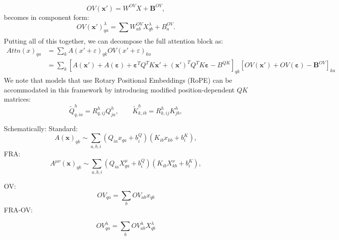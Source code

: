 \documentclass[11pt]{article}
\theoremstyle{definition}
\theoremstyle{plain}
\theoremstyle{remark}
\begin{document}
\begin{equation}
    OV(\mathbf{x}')=W^{OV}X+\mathbf{B}^{OV},
\end{equation}
becomes in component form:
\begin{equation}
    OV(\mathbf{x}')^{\lambda}_{q a}=\sum_{}W^{OV}_{a b}X^\lambda_{q b}+B^{OV}_{a}.
\end{equation}
Putting all of this together, we can decompose the full attention block as:
\begin{align}
    Attn(x)_{q a}&=\sum_{k}A(x'+\varepsilon)_{q k}OV(x'+\varepsilon)_{k a}\\
    &=\sum_{k}\left[        A(\mathbf{x}')+A(\boldsymbol{\varepsilon})+\boldsymbol{\varepsilon}^TQ^TK\mathbf{x}'+(\mathbf{x}')^TQ^TK\boldsymbol{\varepsilon}-B^{QK}
    \right]_{qk}
    \left[
    OV(\mathbf{x}')+OV(\boldsymbol{\varepsilon})-\mathbf{B}^{OV}
    \right]_{k a}
\end{align}
We note that models that use Rotary Positional Embeddings (RoPE) can be accommodated in this framework by introducing modified position-dependent $QK$ matrices:
\begin{equation}
    \tilde Q^h_{q,ia}=R^h_{q,ij}Q^h_{ja},
  \qquad
  \tilde K^h_{k,ib}=R^h_{k,ij}K^h_{jb},
\end{equation}


Schematically:
Standard:
\begin{equation}
    A(\mathbf{x})_{qk}\sim \sum_{a,b,i}
    \left(
        Q_{i a}x_{q a}+b^{Q}_{i}
    \right)
    \left(
        K_{i b}x_{k b}+b^{K}_{i}
    \right),
\end{equation}
FRA:
\begin{equation}
    A^{\mu\nu}(\mathbf{x})_{qk}\sim \sum_{a,b,i}
    \left(
        Q_{i a}X^\mu_{q a}+b^{Q}_{i}
    \right)
    \left(
        K_{i b}X^\nu_{k b}+b^{K}_{i}
    \right),
\end{equation}

OV:
\begin{equation}
    OV_{q a}=\sum_{b}OV_{a b}x_{q b}
\end{equation}
FRA-OV:

\begin{equation}
    OV^\lambda_{q a}=\sum_{b}OV^\lambda_{a b}X^\lambda_{q b}
\end{equation}







\appendix
\end{document}
